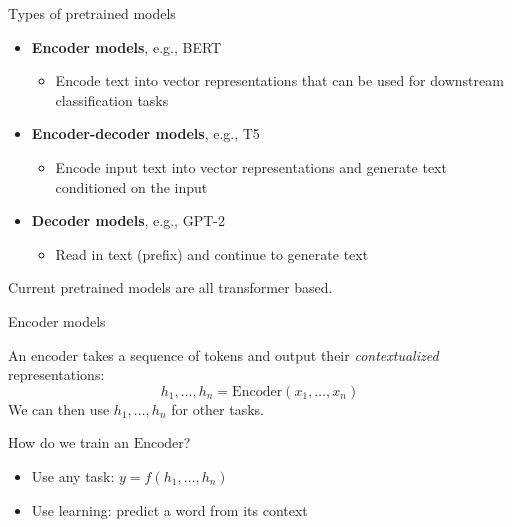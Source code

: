\documentclass[usenames,dvipsnames,notes,11pt,aspectratio=169,hyperref={colorlinks=true, linkcolor=blue}]{beamer}
\begin{document}
\begin{frame}
    {Types of pretrained models}
   
    \begin{itemize}[<+->]
        \itemsep1em
        \item \textbf{Encoder models}, e.g., BERT
            \begin{itemize}[<.->]
                \item Encode text into vector representations that can be used for downstream classification tasks
            \end{itemize}
        \item \textbf{Encoder-decoder models}, e.g., T5
            \begin{itemize}[<.->]
                \item Encode input text into vector representations and generate text conditioned on the input
            \end{itemize}
        \item \textbf{Decoder models}, e.g., GPT-2
            \begin{itemize}[<.->]
                \item Read in text (prefix) and continue to generate text
            \end{itemize}
    \end{itemize}

    \medskip
    Current pretrained models are all transformer based.
\end{frame}

\begin{frame}
    {Encoder models}
    
    An encoder takes a sequence of tokens and output their {\em contextualized} representations:
    $$
        h_1,\ldots,h_n = \mathrm{Encoder}(x_1,\ldots,x_n)
    $$
    We can then use $h_1,\ldots,h_n$ for other tasks.

    \pause\bigskip
    How do we train an $\mathrm{Encoder}$?\\
    \begin{itemize}
        \item Use any  task: $y=f(h_1,\ldots,h_n)$
        \item Use  learning: predict a word from its context 
    \end{itemize}
\end{frame}
\end{document}
